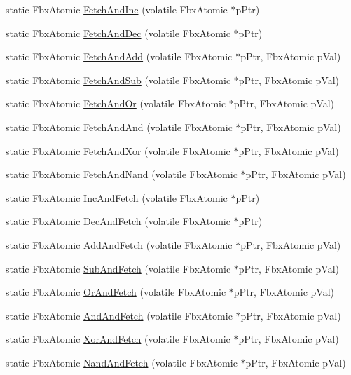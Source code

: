 \begin{DoxyCompactItemize}
\item 
static Fbx\+Atomic \hyperlink{class_fbx_atom_op_ac442236600db5268031a9e8045a97753}{Fetch\+And\+Inc} (volatile Fbx\+Atomic $\ast$p\+Ptr)
\item 
static Fbx\+Atomic \hyperlink{class_fbx_atom_op_a8b0f537c04b2c5be48e4498a4b512e22}{Fetch\+And\+Dec} (volatile Fbx\+Atomic $\ast$p\+Ptr)
\item 
static Fbx\+Atomic \hyperlink{class_fbx_atom_op_a114fbda18ab3db31fa90d1349a3bc723}{Fetch\+And\+Add} (volatile Fbx\+Atomic $\ast$p\+Ptr, Fbx\+Atomic p\+Val)
\item 
static Fbx\+Atomic \hyperlink{class_fbx_atom_op_a05cd6e4895f7459453464434728de7c3}{Fetch\+And\+Sub} (volatile Fbx\+Atomic $\ast$p\+Ptr, Fbx\+Atomic p\+Val)
\item 
static Fbx\+Atomic \hyperlink{class_fbx_atom_op_ab02a669c407687e914a2b373f1b66d69}{Fetch\+And\+Or} (volatile Fbx\+Atomic $\ast$p\+Ptr, Fbx\+Atomic p\+Val)
\item 
static Fbx\+Atomic \hyperlink{class_fbx_atom_op_a40652f1848358c1337083471805e01b0}{Fetch\+And\+And} (volatile Fbx\+Atomic $\ast$p\+Ptr, Fbx\+Atomic p\+Val)
\item 
static Fbx\+Atomic \hyperlink{class_fbx_atom_op_a45474ae63424456067d8ac4cb731bc5b}{Fetch\+And\+Xor} (volatile Fbx\+Atomic $\ast$p\+Ptr, Fbx\+Atomic p\+Val)
\item 
static Fbx\+Atomic \hyperlink{class_fbx_atom_op_a21483c95a1d27b79dbdc70c8c9cd25f2}{Fetch\+And\+Nand} (volatile Fbx\+Atomic $\ast$p\+Ptr, Fbx\+Atomic p\+Val)
\item 
static Fbx\+Atomic \hyperlink{class_fbx_atom_op_a520fde374ed92377de404b020363d440}{Inc\+And\+Fetch} (volatile Fbx\+Atomic $\ast$p\+Ptr)
\item 
static Fbx\+Atomic \hyperlink{class_fbx_atom_op_a1c5402b4ff3ee7e4bed3662109bcbe31}{Dec\+And\+Fetch} (volatile Fbx\+Atomic $\ast$p\+Ptr)
\item 
static Fbx\+Atomic \hyperlink{class_fbx_atom_op_a2eca6078f6e7257334866f900fd32f34}{Add\+And\+Fetch} (volatile Fbx\+Atomic $\ast$p\+Ptr, Fbx\+Atomic p\+Val)
\item 
static Fbx\+Atomic \hyperlink{class_fbx_atom_op_a3e22bd134a890d48dc95d28744ca4e46}{Sub\+And\+Fetch} (volatile Fbx\+Atomic $\ast$p\+Ptr, Fbx\+Atomic p\+Val)
\item 
static Fbx\+Atomic \hyperlink{class_fbx_atom_op_a14bbfad1f361b4154bad77c585d72481}{Or\+And\+Fetch} (volatile Fbx\+Atomic $\ast$p\+Ptr, Fbx\+Atomic p\+Val)
\item 
static Fbx\+Atomic \hyperlink{class_fbx_atom_op_a9306c3602d296c4dbcd9bda4c3dd22cb}{And\+And\+Fetch} (volatile Fbx\+Atomic $\ast$p\+Ptr, Fbx\+Atomic p\+Val)
\item 
static Fbx\+Atomic \hyperlink{class_fbx_atom_op_a25b6645fecbc0bb11c46bb19afeb262a}{Xor\+And\+Fetch} (volatile Fbx\+Atomic $\ast$p\+Ptr, Fbx\+Atomic p\+Val)
\item 
static Fbx\+Atomic \hyperlink{class_fbx_atom_op_a8f19ff95efc360c5b404e780182c9c66}{Nand\+And\+Fetch} (volatile Fbx\+Atomic $\ast$p\+Ptr, Fbx\+Atomic p\+Val)
\end{DoxyCompactItemize}



